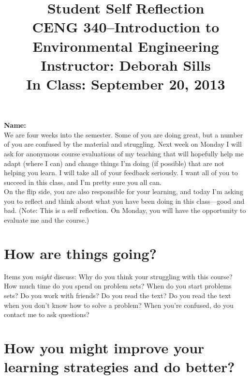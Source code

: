 \documentclass[11pt,letterpaper]{article}
\begin{document}
\setlength{\parindent}{0cm} 



\frenchspacing

\setlength{\textwidth}{6.25in}

\title {\Large{\textbf{Student Self Reflection}}\\ \large{CENG 340--Introduction to Environmental Engineering\\
Instructor: Deborah Sills\\ \textbf{In Class: September 20, 2013}}}

\author {}
\date {}
\maketitle

\vspace{-1.5cm}
\textbf{Name:}\\

We are four weeks into the semester.  Some of you are doing great, but a number of you are confused by the material and struggling.  Next week on Monday I will ask for anonymous course evaluations of my teaching that will hopefully help me adapt (where I can) and change things I'm doing (if possible) that are not helping you learn.  I will take all of your feedback seriously.  I want all of you to succeed in this class, and I'm pretty sure you all can.\\

On the flip side, you are also responsible for your learning, and today I'm asking you to reflect and think about what you have been doing in this class---good and bad. (Note: This is a self reflection.  On Monday, you will have the opportunity to evaluate me and the course.)

\section *{How are things going?}
Items you \emph{might} discuss: Why do you think your struggling with this course? How much time do you spend on problem sets?  When do you start problems sets?  Do you work with friends?  Do you read the text? Do you read the text when you don't know how to solve a problem?  When you're confused, do you contact me to ask questions?

\vspace{2.4in}

\section *{How you might improve your learning strategies and do better?}
\end{document}
